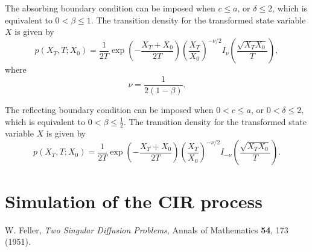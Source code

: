 \documentclass[12pt]{article}
\begin{document}
  The absorbing boundary condition can be imposed when $c\le a$, or $\delta\le 2$, which is equivalent to
  $0<\beta\le 1$. The transition density for the transformed state variable $X$ is given by
  \begin{equation}
    p(X_T,T;X_0)=\frac{1}{2T}\exp\left(-\frac{X_T+X_0}{2T}\right)\left(\frac{X_T}{X_0}\right)^{-\nu/2}
                    I_{\nu}\left(\frac{\sqrt{X_TX_0}}{T}\right),
  \end{equation}
  where
  \begin{equation}
    \nu=\frac{1}{2(1-\beta)}.
  \end{equation}

  The reflecting boundary condition can be imposed when $0<c\le a$, or $0<\delta\le 2$, which is equivalent to
  $0<\beta\le \frac{1}{2}$. The transition density for the transformed state variable $X$ is given by
  \begin{equation}
    p(X_T,T;X_0)=\frac{1}{2T}\exp\left(-\frac{X_T+X_0}{2T}\right)\left(\frac{X_T}{X_0}\right)^{-\nu/2}
                    I_{-\nu}\left(\frac{\sqrt{X_TX_0}}{T}\right).
  \end{equation}

\section{Simulation of the CIR process}


\begin{thebibliography}{99}
    W. Feller, {\it Two Singular Diffusion Problems}, Annals of Mathematics {\bf 54}, 173 (1951).

\end{thebibliography}
\end{document}
